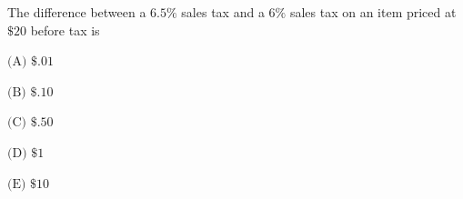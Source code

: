 

The difference between a $6.5\%$ sales tax and a $6\%$ sales tax on an item priced at $\$20$ before tax is

$\text{(A)}$ $\$.01$

$\text{(B)}$ $\$.10$

$\text{(C)}$ $\$ .50$

$\text{(D)}$ $\$ 1$

$\text{(E)}$ $\$10$
